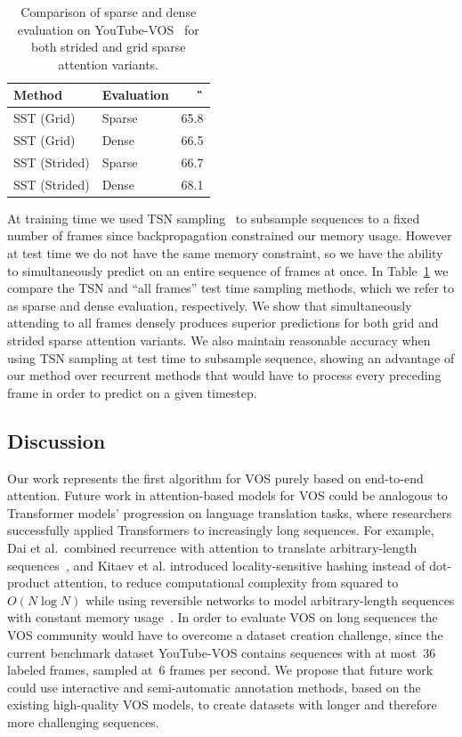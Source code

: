 \begin{table}
\caption{Comparison of sparse and dense evaluation on
         YouTube-VOS~\citep{xu2018youtubevos} for both strided and grid sparse
         attention variants.}
\centering
\begin{tabular}{llr}
\toprule
Method & Evaluation & \G{} \\
\midrule
SST (Grid) & Sparse & \num{65.8} \\
SST (Grid) & Dense & \num{66.5} \\
SST (Strided) & Sparse & \num{66.7} \\
SST (Strided) & Dense & \num[math-rm=\mathbf]{68.1} \\
\bottomrule
\end{tabular}
\label{tab:evalsparse}
\end{table}

At training time we used TSN sampling~\citep{wang2016temporal} to subsample
sequences to a fixed number of frames since backpropagation constrained our
memory usage.
However at test time we do not have the same memory constraint, so we have the
ability to simultaneously predict on an entire sequence of frames at once.
In Table~\ref{tab:evalsparse} we compare the TSN and ``all frames'' test time
sampling methods, which we refer to as sparse and dense evaluation,
respectively.
We show that simultaneously attending to all frames densely produces superior
predictions for both grid and strided sparse attention variants.
We also maintain reasonable accuracy when using TSN sampling at test time to
subsample sequence, showing an advantage of our method over recurrent methods
that would have to process every preceding frame in order to predict on a given
timestep.



\subsection{Discussion}

Our work represents the first algorithm for VOS purely based on end-to-end
attention.
Future work in attention-based models for VOS could be analogous to Transformer
models' progression on language translation tasks, where researchers
successfully applied Transformers to increasingly long sequences.
For example, Dai et al.\ combined recurrence with attention to translate
arbitrary-length sequences~\citep{dai2019transformer}, and Kitaev et al.
introduced locality-sensitive hashing instead of dot-product attention, to
reduce computational complexity from squared to~$O(N\log N)$ while using
reversible networks to model arbitrary-length sequences with constant memory
usage~\citep{kitaev2020reformer}.
In order to evaluate VOS on long sequences the VOS community would have to
overcome a dataset creation challenge, since the current benchmark dataset
YouTube-VOS contains sequences with at most~\num{36} labeled frames, sampled
at~\num{6} frames per second.
We propose that future work could use interactive and semi-automatic annotation
methods, based on the existing high-quality VOS models, to create datasets with
longer and therefore more challenging sequences.


